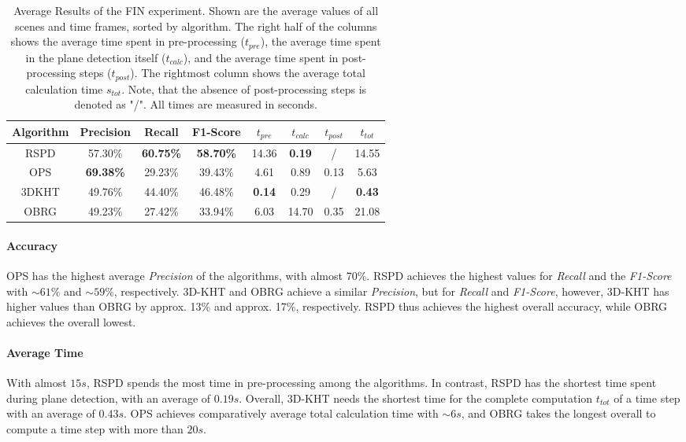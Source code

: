 \documentclass[main.tex]{subfiles}
\begin{document}
\begin{table}[H]
    \centering
    \begin{tabular}{c|cccccc|c}
        Algorithm & Precision        & Recall           & F1-Score         & $t_{pre}$     & $t_{calc}$    & $t_{post}$ & $t_{tot}$     \\ \hline
        RSPD      & 57.30\%          & \textbf{60.75\%} & \textbf{58.70\%} & 14.36         & \textbf{0.19} & /          & 14.55         \\
        OPS       & \textbf{69.38\%} & 29.23\%          & 39.43\%          & 4.61          & 0.89          & 0.13       & 5.63          \\
        3DKHT     & 49.76\%          & 44.40\%          & 46.48\%          & \textbf{0.14} & 0.29          & /          & \textbf{0.43} \\
        OBRG      & 49.23\%          & 27.42\%          & 33.94\%          & 6.03          & 14.70         & 0.35       & 21.08
    \end{tabular}
    \caption[Average FIN Results]{Average Results of the FIN experiment. Shown are the average values of all scenes and time frames, sorted by
        algorithm. The right half of the columns shows the average time spent in pre-processing ($t_{pre}$), the average time spent in the plane
        detection itself ($t_{calc}$), and the average time spent in post-processing steps ($t_{post}$).
        The rightmost column shows the average total calculation time $s_{tot}$.
        Note, that the absence of post-processing steps is denoted as "/".
        All times are measured in seconds.}
    \label{tab:res-fin-total}
\end{table}

\paragraph{Accuracy}
OPS has the highest average \textit{Precision} of the algorithms, with almost 70\%. RSPD achieves the highest values
for \textit{Recall} and the \textit{F1-Score} with ${\sim}61\%$ and ${\sim}59\%$, respectively.
3D-KHT and OBRG achieve a similar \textit{Precision}, but for \textit{Recall} and \textit{F1-Score}, however, 3D-KHT has
higher values than OBRG by approx. 13\% and approx. 17\%, respectively.
RSPD thus achieves the highest overall accuracy, while OBRG achieves the overall lowest.


\paragraph{Average Time}
With almost $15s$, RSPD spends the most time in pre-processing among the algorithms. In contrast, RSPD has the shortest time spent
during plane detection, with an average of $0.19s$. Overall, 3D-KHT needs the shortest time for the complete computation $t_{tot}$
of a time step with an average of $0.43s$. OPS achieves comparatively average total calculation time with ${\sim}6s$, and OBRG
takes the longest overall to compute a time step with more than $20s$.
\end{document}
